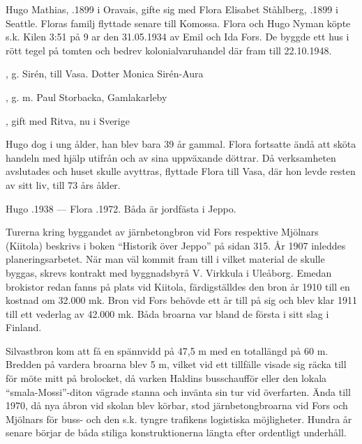 %
Hugo Mathias, .1899 i Oravais, gifte sig med Flora Elisabet Ståhlberg, .1899 i Seattle. Floras familj flyttade senare till Komossa. Flora och Hugo Nyman köpte s.k. Kilen 3:51 på 9 ar den 31.05.1934 av Emil och Ida Fors. De byggde ett hus i rött tegel på tomten och bedrev kolonialvaruhandel där fram till 22.10.1948.
\begin{jhchildren}
  \item {}, g. Sirén, till Vasa. Dotter Monica Sirén-Aura
  \item {}, g. m. Paul Storbacka, Gamlakarleby
  \item {}, gift med Ritva, nu i Sverige
\end{jhchildren}
Hugo dog i ung ålder, han blev bara 39 år gammal. Flora fortsatte ändå att sköta handeln med hjälp utifrån och av sina uppväxande döttrar. Då verksamheten avslutades och huset skulle avyttras, flyttade Flora till Vasa, där hon levde resten av sitt liv, till 73 års ålder.

Hugo .1938  ---  Flora .1972. Båda är jordfästa i Jeppo.



%


%
Turerna kring byggandet av järnbetongbron vid Fors respektive Mjölnars (Kiitola) beskrivs i boken ``Historik över Jeppo'' på sidan 315. År 1907 inleddes planeringsarbetet. När man väl kommit fram till i vilket material de skulle byggas, skrevs kontrakt med byggnadsbyrå V. Virkkula i Uleåborg. Emedan brokistor redan fanns på plats vid Kiitola, färdigställdes den bron år 1910 till en kostnad om 32.000 mk. Bron vid Fors behövde ett år till på sig och blev klar 1911 till ett vederlag av 42.000 mk. Båda broarna var bland de första i sitt slag i Finland.


Silvastbron kom att få en spännvidd på 47,5 m med en totallängd på 60 m. Bredden på vardera broarna blev 5 m, vilket vid ett tillfälle visade sig räcka till för möte mitt på brolocket, då varken Haldins busschaufför eller den lokala ``smala-Mossi''-diton vägrade stanna och invänta sin tur vid överfarten. Ända till 1970, då nya åbron vid skolan blev körbar, stod järnbetongbroarna vid Fors och Mjölnars för buss- och den s.k. tyngre trafikens logistiska möjligheter. Hundra år senare börjar de båda stiliga konstruktionerna längta efter ordentligt underhåll.




